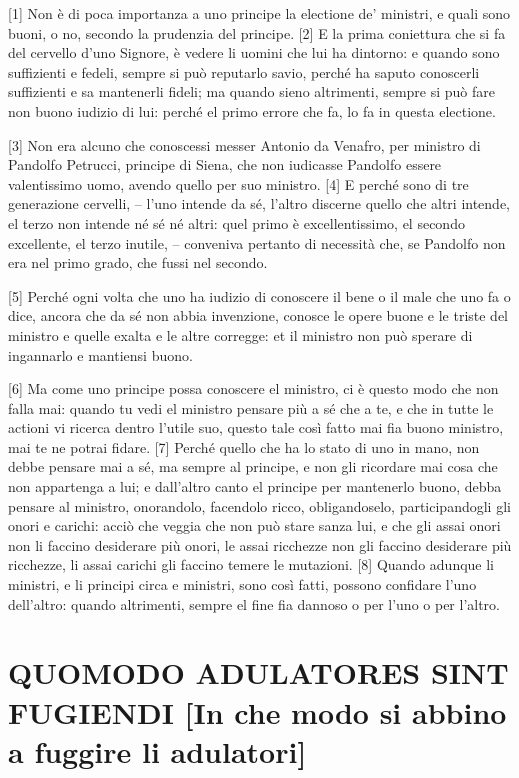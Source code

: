 {[}1{]} Non è di poca importanza a uno principe la electione de'
ministri, e quali sono buoni, o no, secondo la prudenzia del principe.
{[}2{]} E la prima coniettura che si fa del cervello d'uno Signore, è
vedere li uomini che lui ha dintorno: e quando sono suffizienti e
fedeli, sempre si può reputarlo savio, perché ha saputo conoscerli
suffizienti e sa mantenerli fideli; ma quando sieno altrimenti, sempre
si può fare non buono iudizio di lui: perché el primo errore che fa, lo
fa in questa electione.

{[}3{]} Non era alcuno che conoscessi messer Antonio da Venafro, per
ministro di Pandolfo Petrucci, principe di Siena, che non iudicasse
Pandolfo essere valentissimo uomo, avendo quello per suo ministro.
{[}4{]} E perché sono di tre generazione cervelli, -- l'uno intende da
sé, l'altro discerne quello che altri intende, el terzo non intende né
sé né altri: quel primo è excellentissimo, el secondo excellente, el
terzo inutile, -- conveniva pertanto di necessità che, se Pandolfo non
era nel primo grado, che fussi nel secondo.

{[}5{]} Perché ogni volta che uno ha iudizio di conoscere il bene o il
male che uno fa o dice, ancora che da sé non abbia invenzione, conosce
le opere buone e le triste del ministro e quelle exalta e le altre
corregge: et il ministro non può sperare di ingannarlo e mantiensi
buono.

{[}6{]} Ma come uno principe possa conoscere el ministro, ci è questo
modo che non falla mai: quando tu vedi el ministro pensare più a sé che
a te, e che in tutte le actioni vi ricerca dentro l'utile suo, questo
tale così fatto mai fia buono ministro, mai te ne potrai fidare. {[}7{]}
Perché quello che ha lo stato di uno in mano, non debbe pensare mai a
sé, ma sempre al principe, e non gli ricordare mai cosa che non
appartenga a lui; e dall'altro canto el principe per mantenerlo buono,
debba pensare al ministro, onorandolo, facendolo ricco, obligandoselo,
participandogli gli onori e carichi: acciò che veggia che non può stare
sanza lui, e che gli assai onori non li faccino desiderare più onori, le
assai ricchezze non gli faccino desiderare più ricchezze, li assai
carichi gli faccino temere le mutazioni. {[}8{]} Quando adunque li
ministri, e li principi circa e ministri, sono così fatti, possono
confidare l'uno dell'altro: quando altrimenti, sempre el fine fia
dannoso o per l'uno o per l'altro.

\quebra\section{QUOMODO ADULATORES SINT FUGIENDI
{[}In che modo si abbino a fuggire li adulatori{]}}

